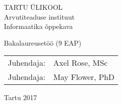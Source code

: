 \documentclass[../thesis.tex]{subfiles}
\begin{document}
\thispagestyle{empty}
\begin{center}

\large
TARTU ÜLIKOOL\\
Arvutiteaduse instituut\\
Informaatika õppekava\\%

\vspace{25mm}

\Large \myauthor

\vspace{4mm}

\huge \mytitle

\vspace{20mm}

\Large Bakalaureusetöö (9 EAP)

\end{center}

\vspace{2mm}

\begin{flushright}
 {
 \setlength{\extrarowheight}{5pt}
 \begin{tabular}{r l} 
  \sffamily Juhendaja: & \sffamily Axel Rose, MSc \\
  \sffamily Juhendaja: & \sffamily May Flower, PhD
 \end{tabular}
 }
\end{flushright}


\vfill
\centerline{Tartu 2017}
\end{document}
